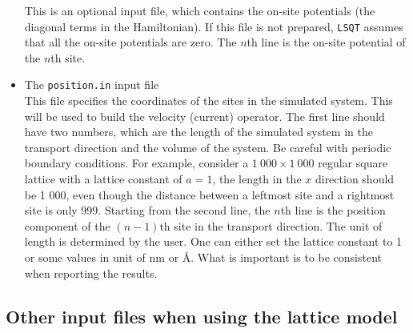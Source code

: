 \documentclass[12pt,a4paper]{report}
\begin{document}
\begin{itemize}
This is an optional input file, which contains the on-site potentials (the diagonal terms in the Hamiltonian). If this file is not prepared, \verb"LSQT" assumes that all the on-site potentials are zero. The $n$th line is the on-site potential of the $n$th site.
\item The \verb"position.in"  input file\\
This file specifies the coordinates of the sites in the simulated system. This will be used to build the velocity (current) operator. The first line should have two numbers, which are the length of the simulated system in the transport direction and the volume of the system. Be careful with periodic boundary conditions. For example, consider a $1~000 \times 1~000$ regular square lattice with a lattice constant of $a=1$, the length in the $x$ direction should be 1 000, even though the distance between a leftmost site and a rightmost site is only 999. Starting from the second line, the $n$th line is the position component of the $(n-1)$th site in the transport direction. The unit of length is determined by the user. One can either set the lattice constant to 1 or some values in unit of nm or \AA. What is important is to be consistent when reporting the results.
\end{itemize}

\subsection{Other input files when using the lattice model}
\end{document}
